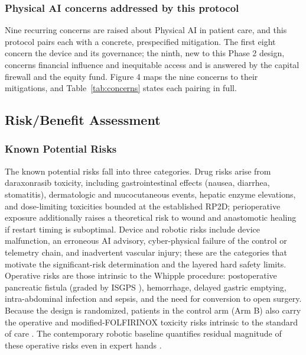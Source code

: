 \subsubsection*{Physical AI concerns addressed by this protocol}

Nine recurring concerns are raised about Physical AI in patient care, and this
protocol pairs each with a concrete, prespecified mitigation. The first eight
concern the device and its governance; the ninth, new to this Phase 2 design,
concerns financial influence and inequitable access and is answered by the capital
firewall and the equity fund. Figure 4 maps the nine concerns to their
mitigations, and Table~\ref{tab:concerns} states each pairing in full.


\subsection{Risk/Benefit Assessment}

\subsubsection{Known Potential Risks}

The known potential risks fall into three categories. Drug risks arise from
daraxonrasib toxicity, including gastrointestinal effects (nausea, diarrhea,
stomatitis), dermatologic and mucocutaneous events, hepatic enzyme elevations,
and dose-limiting toxicities bounded at the established RP2D; perioperative
exposure additionally raises a theoretical risk to wound and anastomotic healing
if restart timing is suboptimal. Device and robotic risks include device
malfunction, an erroneous AI advisory, cyber-physical failure of the control or
telemetry chain, and inadvertent vascular injury; these are the categories that
motivate the significant-risk determination and the layered hard safety limits.
Operative risks are those intrinsic to the Whipple procedure: postoperative
pancreatic fistula (graded by ISGPS \cite{Bassi2017}), hemorrhage, delayed gastric
emptying, intra-abdominal infection and sepsis, and the need for conversion to
open surgery. Because the design is randomized, patients in the control arm (Arm B)
also carry the operative and modified-FOLFIRINOX toxicity risks intrinsic to the
standard of care \cite{Conroy2018}. The contemporary robotic baseline quantifies residual magnitude of these operative risks even in expert hands
\cite{DutchCohort2025}.



